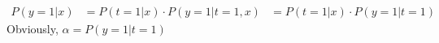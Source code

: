 \begin{answer}
\begin{align*}
P(y=1|x) &= P(t=1|x) \cdot P(y=1|t=1,x)
    &= P(t=1|x) \cdot P(y=1|t=1)
\end{align*}
Obviously, $\alpha = P(y=1|t=1)$
\end{answer}
